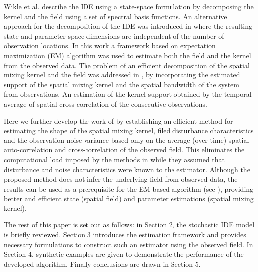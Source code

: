 \documentclass[10pt,twocolumn,twoside]{IEEEtran}
\begin{document}
Wikle et al. \cite{Wikle2002} describe the IDE using a state-space formulation by decomposing the kernel and the field using a set of spectral basis functions. An alternative approach for the decomposition of the IDE was introduced in \cite{Dewar2009} where the resulting state and parameter space dimensions are independent of the number of observation locations. In this work a framework based on expectation maximization (EM)  algorithm \cite{Dempster1977,Gibsona2005}  was used to estimate both the field and the kernel from the observed data.  The problem of an efficient decomposition of the spatial mixing kernel and the field was addressed in \cite{Scerri2009}, by incorporating the estimated support of the spatial mixing kernel and the spatial bandwidth of the system from observations. 
An estimation of the kernel support obtained by the temporal average of spatial cross-correlation of the consecutive observations.  

Here we further develop the work of \cite{Scerri2009} by establishing  an efficient method for estimating the shape of the spatial mixing kernel, filed disturbance characteristics and the observation noise variance based only on the average (over time) spatial auto-correlation and cross-correlation  of the observed field.  This eliminates the computational load imposed by the methods in \cite{Dewar2009,Scerri2009} while they assumed that disturbance and noise characteristics were known to the estimator. Although the proposed method does not infer the underlying field from observed data, the results can be used as a prerequisite for the EM based algorithm (see \cite{Dewar2009,Xu2007}), providing better and efficient state (spatial field) and parameter estimations (spatial mixing kernel). 

The rest of this paper is set out as follows: in Section 2, the stochastic IDE model is briefly reviewed. Section 3 introduces the estimation framework and provides necessary formulations  to construct such an estimator using the observed field. In Section 4, synthetic examples are given to demonstrate the performance of the developed algorithm. Finally conclusions are drawn in Section 5.
\end{document}
